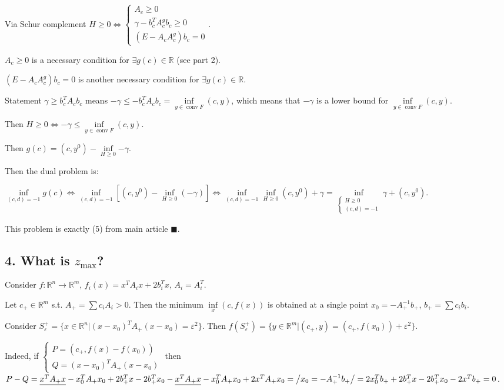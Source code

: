 \documentclass[a4paper]{article}
\DeclareMathOperator{\conv}{conv}
\begin{document}
Via Schur complement $H\geqslant 0\Leftrightarrow \begin{cases}
A_c\geqslant 0\\
\gamma-b_c^TA_c^gb_c\geqslant 0\\
(E-A_cA_c^g)b_c=0
\end{cases}$.

$A_c\geqslant 0$ is a necessary condition for $\exists g(c) \in\mathbb{R}$ (see part 2).

$(E-A_cA_c^g)b_c=0$ is another necessary condition for $\exists g(c)\in\mathbb{R}$.

Statement $\gamma\geqslant b_c^TA_cb_c$ means $-\gamma\leqslant -b_c^TA_cb_c=\inf\limits_{y\in\conv F}(c,y)$, which means that $-\gamma$ is a lower bound for $\inf\limits_{y\in\conv F}(c,y)$.

Then $H\geqslant 0\Leftrightarrow -\gamma\leqslant \inf\limits_{y\in\conv F}(c,y)$.

Then $g(c)=(c,y^0)-\inf\limits_{H\geqslant 0}{-\gamma}$.

Then the dual problem is:

$\inf\limits_{(c,d)=-1}g(c)\Leftrightarrow \inf\limits_{(c,d)=-1}\left[(c,y^0)-\inf\limits_{H\geqslant 0}(-\gamma)\right]\Leftrightarrow \inf\limits_{(c,d)=-1}\inf\limits_{H\geqslant 0}(c,y^0)+\gamma=\boxed{\inf\limits_{\begin{cases}
H\geqslant 0\\
(c,d)=-1
\end{cases}}\gamma+(c,y^0)}$.

This problem is exactly (5) from main article $\blacksquare$.

\subsection*{4. What is $z_{\max}$?}
Consider $f\colon\mathbb{R}^n\to\mathbb{R}^m$, $f_i(x)=x^TA_ix+2b_i^Tx$, $A_i=A_i^T$.

Let $c_+\in\mathbb{R}^m$ s.t. $A_+=\sum c_iA_i > 0$. Then the minimum $\inf\limits_x (c,f(x))$ is obtained at a single point $x_0=-A_+^{-1}b_+$, $b_+=\sum c_ib_i$.

Consider $S_\varepsilon^+=\{x\in\mathbb{R}^n\big| (x-x_0)^TA_+(x-x_0)= \varepsilon^2\}$. Then $f(S_\varepsilon^+)=\{y\in\mathbb{R}^m\big| (c_+,y)=(c_+,f(x_0))+\varepsilon^2 \}$.

Indeed, if $\begin{cases}
P=(c_+,f(x)-f(x_0))\\
Q=(x-x_0)^TA_+(x-x_0)
\end{cases}$
then $P-Q=\underline{x^TA_+x}-x_0^TA_+x_0+2b_+^Tx-2b_+^Tx_0-\underline{x^TA_+x}-x_0^TA_+x_0+2x^TA_+x_0=\left/x_0=-A_+^{-1}b_+\right/=2x_0^Tb_++2b_+^Tx-2b_+^Tx_0-2x^Tb_+=0$.
\end{document}
